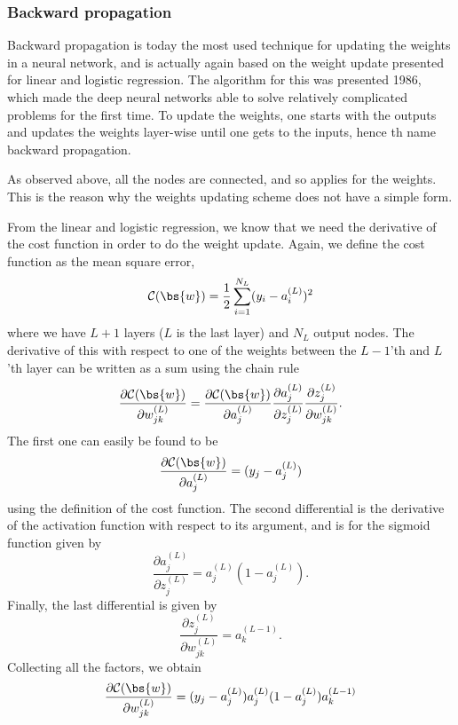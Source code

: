 \subsubsection{Backward propagation} \label{sec:backward}
Backward propagation is today the most used technique for updating the weights in a neural network, and is actually again based on the weight update presented for linear and logistic regression. The algorithm for this was presented 1986, which made the deep neural networks able to solve relatively complicated problems for the first time. \cite{rumelhart_learning_1986} To update the weights, one starts with the outputs and updates the weights layer-wise until one gets to the inputs, hence th name backward propagation. 

As observed above, all the nodes are connected, and so applies for the weights. This is the reason why the weights updating scheme does not have a simple form. 

From the linear and logistic regression, we know that we need the derivative of the cost function in order to do the weight update. Again, we define the cost function as the mean square error,
\begin{equation}
\mathcal{C}(\bs{w})=\frac{1}{2}\sum_{i=1}^{N_L}(y_i-a_i^{(L)})^2
\end{equation}
where we have $L+1$ layers ($L$ is the last layer) and $N_L$ output nodes. The derivative of this with respect to one of the weights between the $L-1$'th and $L$'th layer can be written as a sum using the chain rule
\begin{equation}
\frac{\partial\mathcal{C}(\bs{w})}{\partial w_{jk}^{(L)}}=\frac{\partial\mathcal{C}(\bs{w})}{\partial a_j^{(L)}}\frac{\partial a_j^{(L)}}{\partial z_j^{(L)}}\frac{\partial z_j^{(L)}}{\partial w_{jk}^{(L)}}.
\end{equation}
The first one can easily be found to be
\begin{equation}
\frac{\partial\mathcal{C}(\bs{w})}{\partial a_j^{(L)}}=(y_j-a_j^{(L)})
\end{equation}
using the definition of the cost function. The second differential is the derivative of the activation function with respect to its argument, and is for the sigmoid function given by
\begin{equation}
\frac{\partial a_j^{(L)}}{\partial z_j^{(L)}}=a_j^{(L)}(1-a_j^{(L)}).
\end{equation}
Finally, the last differential is given by 
\begin{equation}
\frac{\partial z_j^{(L)}}{\partial w_{jk}^{(L)}}=a_k^{(L-1)}.
\end{equation}
Collecting all the factors, we obtain 
\begin{equation}
\frac{\partial\mathcal{C}(\bs{w})}{\partial w_{jk}^{(L)}}=(y_j-a_j^{(L)})a_j^{(L)}(1-a_j^{(L)})a_k^{(L-1)}
\end{equation}

